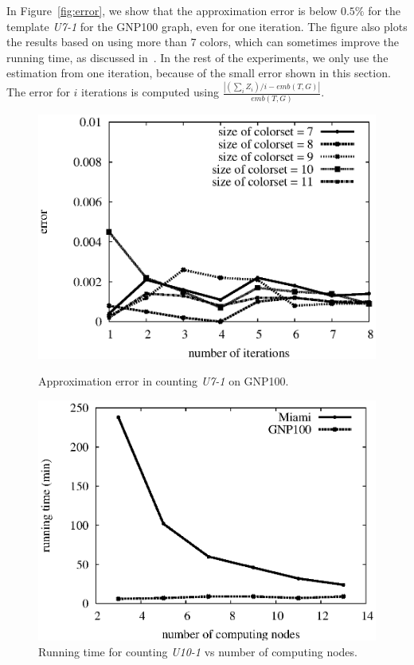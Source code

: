 In Figure~\ref{fig:error}, we show that the approximation error is below $0.5\%$
for the template \emph{U7-1} for the GNP100 graph, even for one iteration. The
figure also plots the results based on using more than 7 colors, which can
sometimes improve the running time, as discussed in~\cite{huffner2008algorithm}.
In the rest of the experiments, we only use the estimation from one iteration,
because of the small error shown in this section. The error for $i$ iterations
is computed using $\frac{|(\sum_i{Z_i})/i-emb(T,G)|}{emb(T,G)}$.


\begin{figure}[htbp]
\hfill
\begin{minipage}[t]{0.45\linewidth}
\begin{center}
\centerline{\includegraphics[scale=0.33]{plots/gnpError.eps}}
\caption{Approximation error in counting \emph{U7-1} on GNP100.}
\label{fig:error}
\end{center}
\end{minipage}
\hfill
\begin{minipage}[t]{0.45\linewidth}
\begin{center}
\centerline{\includegraphics[scale=0.33]{plots/nodes-scale.eps}}
\caption{Running time for counting \textit{U10-1} vs number of computing nodes.}
\label{fig:nodes-scale}
\end{center}
\end{minipage}
\hfill
\end{figure}



